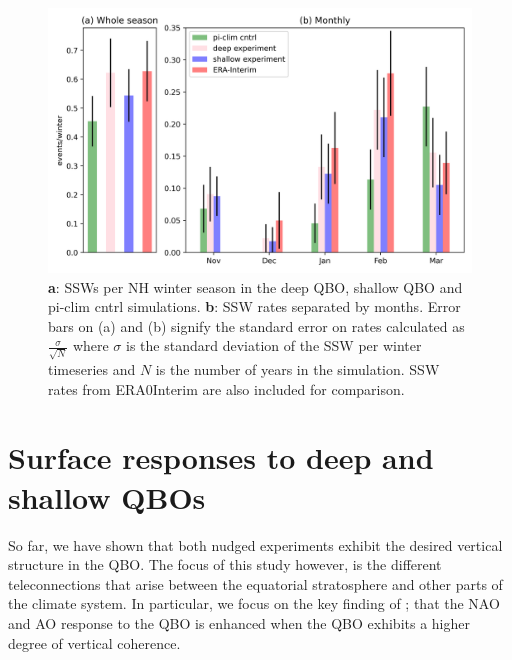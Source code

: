 \begin{figure}[h!]
\begin{center}
\noindent\includegraphics[width = 0.8\linewidth]{Figures/Figures-deepQBO/SSW_hist.png}
\caption[SSWs per NH winter season in each nudged experiment]{\textbf{a}: SSWs per NH winter season in the deep QBO, shallow QBO and pi-clim cntrl simulations. \textbf{b}: SSW rates separated by months. Error bars on (a) and (b) signify the standard error on rates calculated as $\frac{\sigma}{\sqrt{N}}$ where $\sigma$ is the standard deviation of the SSW per winter timeseries and $N$ is the number of years in the simulation. SSW rates from ERA0Interim are also included for comparison.}
\label{fig:SSW_histogram_experiments}
\end{center}
\end{figure}

\newpage

\section{Surface responses to deep and shallow QBOs}
\label{sec:MSLP_responses}
So far, we have shown that both nudged experiments exhibit the desired vertical structure in the QBO. The focus of this study however, is the different teleconnections that arise between the equatorial stratosphere and other parts of the climate system. In particular, we focus on the key finding of \cite{andrewsObserved2019d}; that the NAO and AO response to the QBO is enhanced when the QBO exhibits a higher degree of vertical coherence. 

